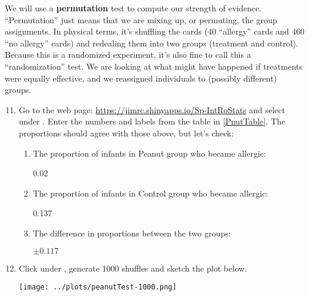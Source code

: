    We will use a {\bf permutation} test to compute our strength of
   evidence. ``Permutation''  just means that we are mixing up, or
   permuting, the group assignments.  In physical terms, it's
   shuffling the cards (40 ``allergy'' cards and 460 ``no allergy''
   cards)  and redealing them into two groups (treatment and control).
   Because  this is a randomized experiment, it's also fine to call this a
   ``randomization'' test.  We are looking at what might have happened
   if treatments were equally effective, and we reassigned individuals
   to (possibly different) groups.
 \begin{enumerate}
  \setcounter{enumi}{10}
   \item Go to the  web page:
   \url{https://jimrc.shinyapps.io/Sp-IntRoStats}
   and select  under  .
   Enter the numbers and labels from the table in \ref{PnutTable}.
   The proportions should agree with those above, but let's check:
   \begin{enumerate}
   \item 
     The proportion of infants in Peanut group who became allergic: \\ 
\begin{key}
 0.02       
\end{key}
   \item The proportion of infants in Control group who became allergic: \\ 
\begin{key}
 0.137       
\end{key}
\item The difference in proportions between the two groups: 
\begin{students}
\vspace{1cm}
\end{students}

\begin{key}
  {\it $ \pm 0.117$ }
\end{key}
\end{enumerate}

   \item  Click  under ,  generate  1000
     shuffles and sketch the plot below. 
\begin{students}
\vspace{4cm}
\end{students}

\begin{key}
  \texttt{[image: ../plots/peanutTest-1000.png]}
\end{key}


\end{enumerate}
